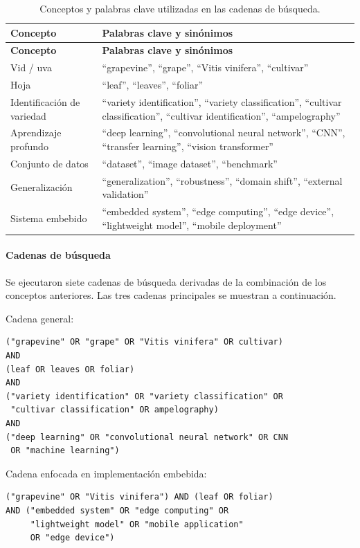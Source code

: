 \begin{longtable}{L{3.6cm}L{10.4cm}}
\caption{Conceptos y palabras clave utilizadas en las cadenas de búsqueda.}
\label{tab:palabras} \\
\toprule
\textbf{Concepto} & \textbf{Palabras clave y sinónimos} \\
\midrule
\endfirsthead
\toprule
\textbf{Concepto} & \textbf{Palabras clave y sinónimos} \\
\midrule
\endhead
Vid / uva & ``grapevine'', ``grape'', ``Vitis vinifera'', ``cultivar'' \\
Hoja & ``leaf'', ``leaves'', ``foliar'' \\
Identificación de variedad & ``variety identification'', ``variety classification'', ``cultivar classification'', ``cultivar identification'', ``ampelography'' \\
Aprendizaje profundo & ``deep learning'', ``convolutional neural network'', ``CNN'', ``transfer learning'', ``vision transformer'' \\
Conjunto de datos & ``dataset'', ``image dataset'', ``benchmark'' \\
Generalización & ``generalization'', ``robustness'', ``domain shift'', ``external validation'' \\
Sistema embebido & ``embedded system'', ``edge computing'', ``edge device'', ``lightweight model'', ``mobile deployment'' \\
\bottomrule
\end{longtable}

\paragraph{Cadenas de búsqueda}

Se ejecutaron siete cadenas de búsqueda derivadas de la combinación de los
conceptos anteriores. Las tres cadenas principales se muestran a
continuación.

Cadena general:
\begin{verbatim}
("grapevine" OR "grape" OR "Vitis vinifera" OR cultivar)
AND
(leaf OR leaves OR foliar)
AND
("variety identification" OR "variety classification" OR
 "cultivar classification" OR ampelography)
AND
("deep learning" OR "convolutional neural network" OR CNN
 OR "machine learning")
\end{verbatim}

Cadena enfocada en implementación embebida:
\begin{verbatim}
("grapevine" OR "Vitis vinifera") AND (leaf OR foliar)
AND ("embedded system" OR "edge computing" OR
     "lightweight model" OR "mobile application"
     OR "edge device")
\end{verbatim}

